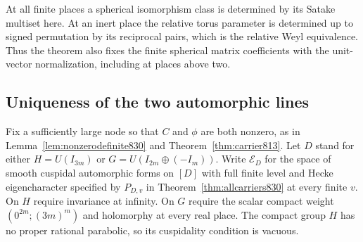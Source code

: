\documentclass[a4paper,11pt]{article}
\theoremstyle{definition}
\theoremstyle{remark}
\numberwithin{equation}{section}
\begin{document}
At all finite places a spherical isomorphism class is determined
by its Satake multiset here. At an inert place the relative torus
parameter is determined up to signed permutation by its reciprocal
pairs, which is the relative Weyl equivalence. Thus the theorem
also fixes the finite spherical matrix coefficients with the
unit-vector normalization, including at places above two.
\clearpage

\subsection{Uniqueness of the two automorphic lines}
\label{sec:carrierlines831}
Fix a sufficiently large node so that \(C\) and \(\phi\) are
both nonzero, as in Lemma~\ref{lem:nonzerodefinite830} and
Theorem~\ref{thm:carrier813}. Let \(D\) stand for either
\(H=U(I_{3m})\) or \(G=U(I_{2m}\oplus(-I_m))\).
Write \(\mathcal E_D\) for the space of smooth cuspidal
automorphic forms on \([D]\) with full finite level and
Hecke eigencharacter specified by \(P_{D,v}\) in
Theorem~\ref{thm:allcarriers830} at every finite \(v\).
On \(H\) require invariance at infinity. On \(G\) require the
scalar compact weight \((0^{2m};(3m)^m)\) and holomorphy at
every real place. The compact group \(H\) has no proper
rational parabolic, so its cuspidality condition is vacuous.
\end{document}
